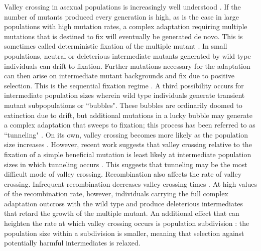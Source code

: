 \documentclass[rmp]{revtex4}
\begin{document}
\begin{spacing}{1.5}
Valley crossing in asexual populations is increasingly well understood \citep{weissman_2009}.
If the number of mutants produced every generation is high, as is the case in large populations with high mutation rates, a complex adaptation requiring multiple mutations that is destined to fix will eventually be generated de novo.
This is sometimes called deterministic fixation of the multiple mutant \citep{weissman_2009}.
In small populations, neutral or deleterious intermediate mutants generated by wild type individuals can drift to fixation. Further mutations necessary for the adaptation can then arise on intermediate mutant backgrounds and fix due to positive selection.
This is the sequential fixation regime \citep{weissman_2009}.
A third possibility occurs for intermediate population sizes wherein wild type individuals generate transient mutant subpopulations or ``bubbles".
These bubbles are ordinarily doomed to extinction due to drift, but additional mutations in a lucky bubble may generate a complex adaptation that sweeps to fixation; this process has been referred to as ``tunneling" \citep{iwasa_2004, weissman_2009}.
On its own, valley crossing becomes more likely as the population size increases \citep{weissman_2009}. However, recent work suggests that valley crossing relative to the fixation of a simple beneficial mutation is least likely at intermediate population sizes in which tunneling occurs \citet{ochs_2015}. This suggests that tunneling may be the most difficult mode of valley crossing. 
Recombination also affects the rate of valley crossing.
Infrequent recombination decreases valley crossing times \citep{weissman_2010}.
At high values of the recombination rate, however, individuals carrying the full complex adaptation outcross with the wild type and produce deleterious intermediates that retard the growth of the multiple mutant.
An additional effect that can heighten the rate at which valley crossing occurs is population subdivision \citep{Bitbol:Schwab:2014}: the population size within a subdivision is smaller, meaning that selection against potentially harmful intermediates is relaxed.


\end{spacing}
\end{document}
